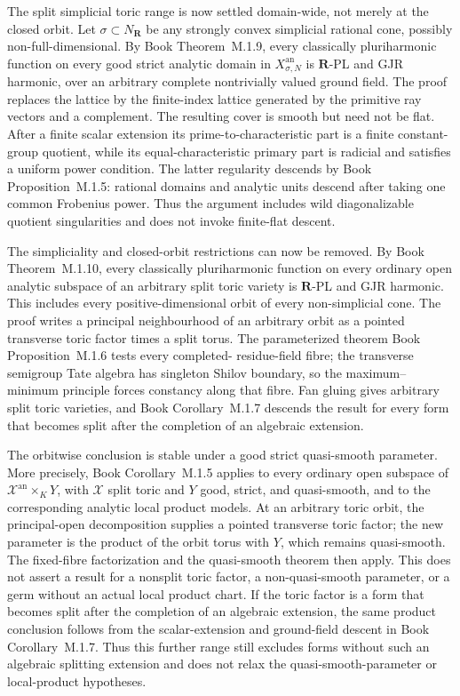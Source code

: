 \documentclass[11pt,a4paper]{article}
\theoremstyle{definition}
\theoremstyle{remark}
\begin{document}
The split simplicial toric range is now settled domain-wide, not merely at
the closed orbit.  Let \(\sigma\subset N_{\mathbf R}\) be any strongly
convex simplicial rational cone, possibly non-full-dimensional.  By
Book Theorem~M.1.9, every classically pluriharmonic
function on every good strict analytic domain in
\(X_{\sigma,N}^{\mathrm{an}}\) is \(\mathbf R\)-PL and GJR harmonic, over
an arbitrary complete nontrivially valued ground field.  The proof replaces
the lattice by the finite-index lattice generated by the primitive ray
vectors and a complement.  The resulting cover is smooth but need not be
flat.  After a finite scalar extension its prime-to-characteristic part is
a finite constant-group quotient, while its equal-characteristic primary
part is radicial and satisfies a uniform power condition.  The latter
regularity descends by Book Proposition~M.1.5: rational
domains and analytic units descend after taking one common Frobenius power.
Thus the argument includes wild diagonalizable quotient singularities and
does not invoke finite-flat descent.

The simpliciality and closed-orbit restrictions can now be removed.  By
Book Theorem~M.1.10, every classically pluriharmonic
function on every ordinary open analytic subspace of an arbitrary split
toric variety is \(\mathbf R\)-PL and GJR harmonic.  This includes every
positive-dimensional orbit of every non-simplicial cone.  The proof writes a
principal neighbourhood of an arbitrary orbit as a pointed transverse toric
factor times a split torus.  The parameterized theorem
Book Proposition~M.1.6 tests every completed-
residue-field fibre; the transverse semigroup Tate algebra has singleton
Shilov boundary, so the maximum--minimum principle forces constancy along
that fibre.  Fan gluing gives arbitrary split toric varieties, and
Book Corollary~M.1.7 descends the result for every
form that becomes split after the completion of an algebraic extension.

The orbitwise conclusion is stable under a good strict quasi-smooth
parameter.  More precisely,
Book Corollary~M.1.5 applies to every ordinary
open subspace of \(\mathcal X^{\mathrm{an}}\times_KY\), with
\(\mathcal X\) split toric and \(Y\) good, strict, and quasi-smooth, and
to the corresponding analytic local product models.  At an arbitrary toric
orbit, the principal-open decomposition supplies a pointed transverse toric
factor; the new parameter is the product of the orbit torus with \(Y\),
which remains quasi-smooth.  The fixed-fibre factorization and the
quasi-smooth theorem then apply.  This does not assert a result for a
nonsplit toric factor, a non-quasi-smooth parameter, or a germ without an
actual local product chart.
If the toric factor is a form that becomes split after the completion of an
algebraic extension, the same product conclusion follows from the
scalar-extension and ground-field descent in
Book Corollary~M.1.7.  Thus this further range still
excludes forms without such an algebraic splitting extension and does not
relax the quasi-smooth-parameter or local-product hypotheses.
\end{document}
